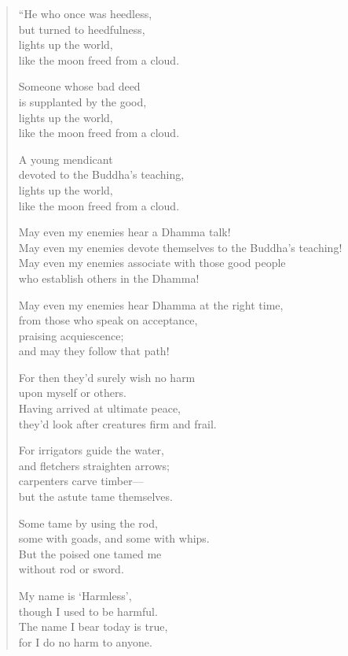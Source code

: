 \documentclass[12pt,openany]{book}%
\begin{document}
\begin{verse}%
“He who once was heedless, \\
but turned to heedfulness, \\
lights up the world, \\
like the moon freed from a cloud. 

Someone whose bad deed \\
is supplanted by the good, \\
lights up the world, \\
like the moon freed from a cloud. 

A young mendicant \\
devoted to the Buddha’s teaching, \\
lights up the world, \\
like the moon freed from a cloud. 

May even my enemies hear a Dhamma talk! \\
May even my enemies devote themselves to the Buddha’s teaching! \\
May even my enemies associate with those good people \\
who establish others in the Dhamma! 

May even my enemies hear Dhamma at the right time, \\
from those who speak on acceptance, \\
praising acquiescence; \\
and may they follow that path! 

For then they’d surely wish no harm \\
upon myself or others. \\
Having arrived at ultimate peace, \\
they’d look after creatures firm and frail. 

For irrigators guide the water, \\
and fletchers straighten arrows; \\
carpenters carve timber—\\
but the astute tame themselves. 

Some tame by using the rod, \\
some with goads, and some with whips. \\
But the poised one tamed me \\
without rod or sword. 

My name is ‘Harmless’, \\
though I used to be harmful. \\
The name I bear today is true, \\
for I do no harm to anyone. 


\end{verse}
\end{document}
